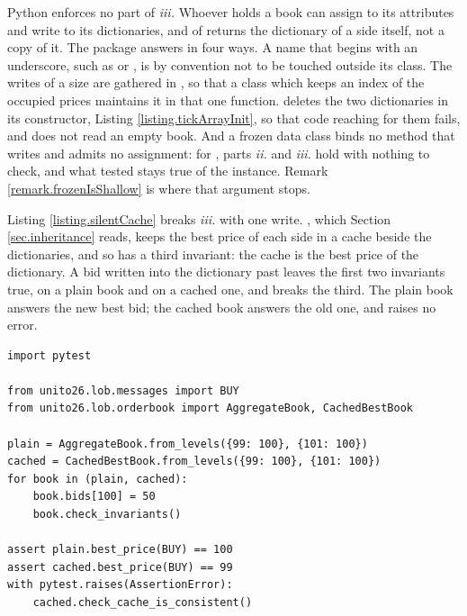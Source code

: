 Python enforces no part of \emph{iii.}
Whoever holds a book can assign to its attributes and write to its dictionaries,
and  of  returns the dictionary of a side itself,
not a copy of it.
The package answers in four ways.
A name that begins with an underscore, such as  or ,
is by convention not to be touched outside its class.
The writes of a size are gathered in ,
so that a class which keeps an index of the occupied prices
maintains it in that one function.
 deletes the two dictionaries in its constructor,
Listing \ref{listing.tickArrayInit},
so that code reaching for them fails, and does not read an empty book.
And a frozen data class binds no method that writes and admits no assignment:
for , parts \emph{ii.} and \emph{iii.} hold with nothing to check,
and what  tested stays true of the instance.
Remark \ref{remark.frozenIsShallow} is where that argument stops.

Listing \ref{listing.silentCache} breaks \emph{iii.} with one write.
, which Section \ref{sec.inheritance} reads,
keeps the best price of each side in a cache beside the dictionaries,
and so has a third invariant: the cache is the best price of the dictionary.
A bid written into the dictionary past 
leaves the first two invariants true, on a plain book and on a cached one,
and breaks the third.
The plain book answers the new best bid;
the cached book answers the old one, and raises no error.

\begin{lstlisting}[caption={A write that bypasses the methods, and the invariant it breaks.}, label=listing.silentCache]
import pytest

from unito26.lob.messages import BUY
from unito26.lob.orderbook import AggregateBook, CachedBestBook

plain = AggregateBook.from_levels({99: 100}, {101: 100})
cached = CachedBestBook.from_levels({99: 100}, {101: 100})
for book in (plain, cached):
    book.bids[100] = 50
    book.check_invariants()

assert plain.best_price(BUY) == 100
assert cached.best_price(BUY) == 99
with pytest.raises(AssertionError):
    cached.check_cache_is_consistent()
\end{lstlisting}
